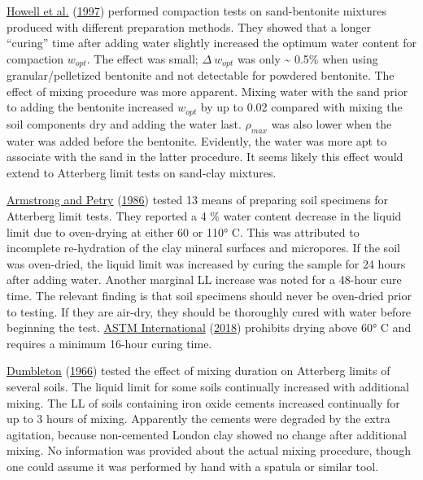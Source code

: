 \documentclass[
  letterpaper,
  openany]{book}
\begin{document}
\protect\hyperlink{ref-Howell1997}{Howell et al.} (\protect\hyperlink{ref-Howell1997}{1997}) performed compaction tests on sand-bentonite mixtures produced with different preparation methods.
They showed that a longer ``curing'' time after adding water slightly increased the optimum water content for compaction \(w_{opt}\).
The effect was small; \(\Delta~w_{opt}\) was only \textasciitilde{} 0.5\% when using granular/pelletized bentonite and not detectable for powdered bentonite.
The effect of mixing procedure was more apparent.
Mixing water with the sand prior to adding the bentonite increased \(w_{opt}\) by up to 0.02 compared with mixing the soil components dry and adding the water last. \(\rho_{max}\) was also lower when the water was added before the bentonite.
Evidently, the water was more apt to associate with the sand in the latter procedure.
It seems likely this effect would extend to Atterberg limit tests on sand-clay mixtures.

\protect\hyperlink{ref-Armstrong1986}{Armstrong and Petry} (\protect\hyperlink{ref-Armstrong1986}{1986}) tested 13 means of preparing soil specimens for Atterberg limit tests.
They reported a 4 \% water content decrease in the liquid limit due to oven-drying at either 60 or 110° C.
This was attributed to incomplete re-hydration of the clay mineral surfaces and micropores.
If the soil was oven-dried, the liquid limit was increased by curing the sample for 24 hours after adding water.
Another marginal LL increase was noted for a 48-hour cure time.
The relevant finding is that soil specimens should never be oven-dried prior to testing. If they are air-dry, they should be thoroughly cured with water before beginning the test.
\protect\hyperlink{ref-ASTMD43182018}{ASTM International} (\protect\hyperlink{ref-ASTMD43182018}{2018}) prohibits drying above 60° C and requires a minimum 16-hour curing time.

\protect\hyperlink{ref-Dumbleton1966a}{Dumbleton} (\protect\hyperlink{ref-Dumbleton1966a}{1966}) tested the effect of mixing duration on Atterberg limits of several soils.
The liquid limit for some soils continually increased with additional mixing.
The LL of soils containing iron oxide cements increased continually for up to 3 hours of mixing.
Apparently the cements were degraded by the extra agitation, because non-cemented London clay showed no change after additional mixing.
No information was provided about the actual mixing procedure, though one could assume it was performed by hand with a spatula or similar tool.
\end{document}

